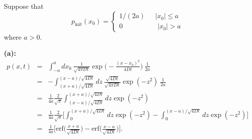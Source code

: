 Suppose that
\begin{equation*}
p_\text{init}(x_0) =  \left\{
        \begin{array}{ll}
            1/(2a) & ~~~|x_0| \leq a \\
            0 & \quad |x_0|>a
        \end{array}
    \right.
\end{equation*}
where $a>0$.

\textbf{(a):} 
\begin{eqnarray}
p(x,t) &=& \int_{-a}^{a} dx_0~\frac{1}{\sqrt{4 \pi D t} } \exp\bigg(- \frac{(x-x_0)^2}{4 D t}\bigg)~\frac{1}{2a} \nonumber \\
&=& -\int_{(x+a)/\sqrt{4Dt}}^{(x-a)/\sqrt{4Dt}} dz~\frac{\sqrt{4Dt}}{\sqrt{4 \pi D t} } \exp(- z^2)~\frac{1}{2a} \nonumber \\
&=& \frac{1}{4a} \frac{2}{\sqrt{\pi}} \int_{(x-a)/\sqrt{4Dt}}^{(x+a)/\sqrt{4Dt}} dz \exp(-z^2) \nonumber \\
&=& \frac{1}{4a} \frac{2}{\sqrt{\pi}} \bigg[ \int_{0}^{(x+a)/\sqrt{4Dt}} dz \exp(-z^2) - \int_{0}^{(x-a)/\sqrt{4Dt}} dz \exp(-z^2) \bigg] \\
&=&  \frac{1}{4a} \Bigg[ \text{erf}\bigg(\frac{x+a}{\sqrt{4 D t}}\bigg) - \text{erf}\bigg(\frac{x-a}{\sqrt{4 D t}}\bigg)\Bigg].
\end{eqnarray}

